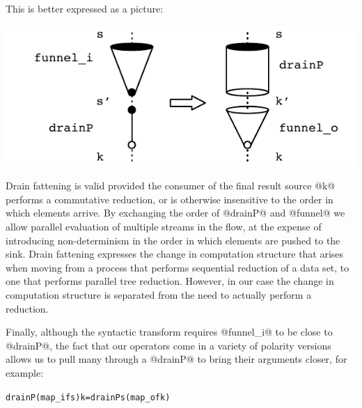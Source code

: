 This is better expressed as a picture:
\begin{center}
\includegraphics[scale=0.8]{figures/drain-fatten.pdf}
\end{center}

Drain fattening is valid provided the consumer of the final result source @k@ performs a commutative reduction, or is otherwise insensitive to the order in which elements arrive. By exchanging the order of @drainP@ and @funnel@ we allow parallel evaluation of multiple streams in the flow, at the expense of introducing non-determinism in the order in which elements are pushed to the sink. Drain fattening expresses the change in computation structure that arises when moving from a process that performs sequential reduction of a data set, to one that performs parallel tree reduction. However, in our case the change in computation structure is separated from the need to actually perform a reduction.

Finally, although the syntactic transform requires @funnel_i@ to be close to @drainP@, the fact that our operators come in a variety of polarity versions allows us to pull many through a @drainP@ to bring their arguments closer, for example:
\begin{alltt}
  drainP (map_i f s) k  =  drainP s (map_o f k)
\end{alltt}

